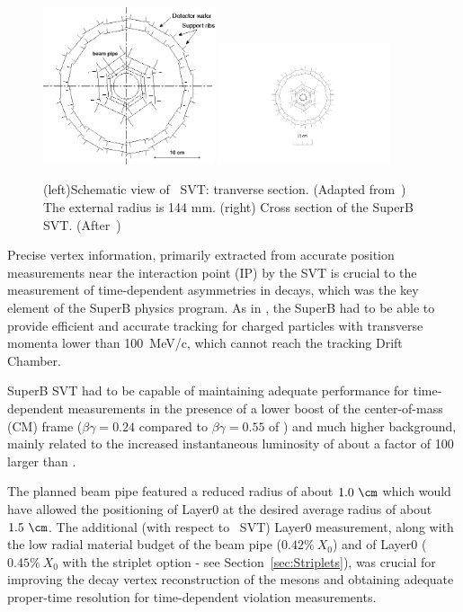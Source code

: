 \begin{figure}
\centering
\includegraphics[width=0.45\textwidth]{SVT_details.png}
\includegraphics[width=0.45\textwidth]{miniSuperBSVT.pdf}
\caption{\label{fig:svt} (left)Schematic view of \babar\ SVT: tranverse section. (Adapted from~\cite{BaBarSVTreview}) The external radius is 144 mm. (right) Cross section of the SuperB SVT. (After~\cite{Baszczyk:2013xua}) }
\end{figure}


Precise vertex information, primarily extracted from accurate position measurements near the 
interaction point (IP) by the SVT  is crucial to the measurement of time-dependent \CP asymmetries 
in \Bz decays, which was the  key element of the SuperB physics program. As in \babar, the SuperB 
had to be able to provide efficient and accurate tracking for  charged particles with transverse 
momenta lower than 100~MeV/c, which cannot reach the tracking Drift Chamber.

SuperB SVT had to be capable of maintaining adequate performance for time-dependent 
measurements
 in the presence of a lower boost of the center-of-mass (CM) frame
($\beta\gamma = 0.24$ compared to $\beta\gamma = 0.55$ of \babar) and much higher background,
mainly related to the increased instantaneous luminosity of about a factor of 100 larger than \babar.

The planned beam pipe featured a reduced radius of about $1.0~\cm$  which would have allowed
 the positioning of 
Layer0 at
the desired average radius of about $1.5~\cm$. The additional  (with respect to \babar\ SVT) 
 Layer0 measurement,
along with the low radial material budget of the beam pipe ($0.42\%~X_0$)
and of Layer0 ($0.45\%~X_0$ with the striplet option - see Section~\ref{sec:Striplets}),
was crucial for improving the decay vertex reconstruction of the \B mesons and
 obtaining adequate proper-time resolution for time-dependent \CP violation measurements.

